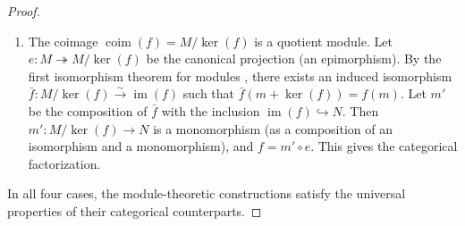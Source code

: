 \begin{proof}
\begin{enumerate}
        \item The coimage $\operatorname{coim}(f) = M/\ker(f)$ is a quotient module. Let $e: M \twoheadrightarrow M/\ker(f)$ be the canonical projection (an epimorphism). By the first isomorphism theorem for modules , there exists an induced isomorphism $\bar{f}: M/\ker(f) \xrightarrow{\sim} \operatorname{im}(f)$ such that $\bar{f}(m + \ker(f)) = f(m)$. Let $m'$ be the composition of $\bar{f}$ with the inclusion $\operatorname{im}(f) \hookrightarrow N$. Then $m': M/\ker(f) \to N$ is a monomorphism (as a composition of an isomorphism and a monomorphism), and $f = m' \circ e$. This gives the categorical  factorization.
    \end{enumerate}

    In all four cases, the module-theoretic constructions satisfy the universal properties of their categorical counterparts.
\end{proof}
